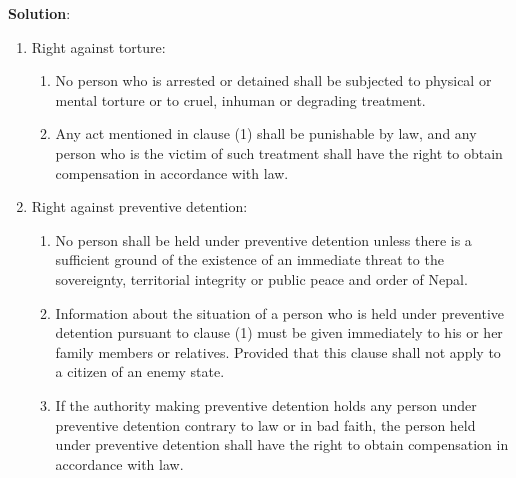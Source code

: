 \documentclass[
]{book}
\newenvironment{solution}{ {\bfseries Solution}:}{}
\begin{document}
\begin{questions}
\begin{solution}
\begin{enumerate}
\item Right against torture:
\begin{enumerate}
\item No person who is arrested or detained shall be subjected to physical or mental torture or to cruel, inhuman or degrading treatment.
\item Any act mentioned in clause (1) shall be punishable by law, and any person who is the victim of such treatment shall have the right to obtain compensation in accordance with law.
\end{enumerate}

\item Right against preventive detention:
\begin{enumerate}
\item No person shall be held under preventive detention unless there is a sufficient ground of the existence of an immediate threat to the sovereignty, territorial integrity or public peace and order of Nepal.
\item Information about the situation of a person who is held under preventive detention pursuant to clause (1) must be given immediately to his or her family members or relatives. Provided that this clause shall not apply to a citizen of an enemy state.
\item If the authority making preventive detention holds any person under preventive detention contrary to law or in bad faith, the person held under preventive detention shall have the right to obtain compensation in accordance with law.
\end{enumerate}


\end{enumerate}
\end{solution}
\end{questions}
\end{document}
